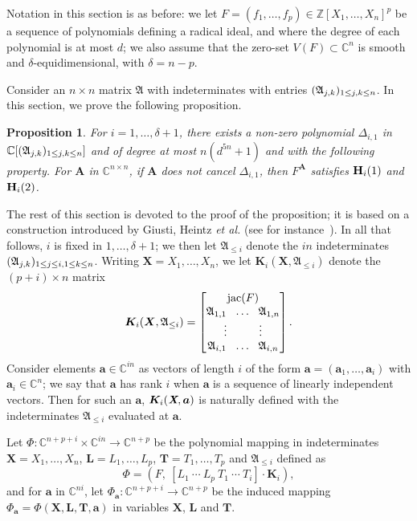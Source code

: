 \documentclass[12pt]{article}
\def\A{\mathfrak{A}}
\def\Xb{\textit{\textbf{X}}}
\def\mA{{\bm A}}
\def\D{\Delta}
\DeclareMathOperator{\jac}{jac}
\newcommand{\ZZ}{{\mathbb{Z}}}
\def\C{\mathbb{C}}
\def\bbm{\begin{bmatrix}}
\def\ebm{\end{bmatrix}}
\newtheorem{prop}[theorem]{Proposition}
\begin{document}
Notation in this section is as before: we let $F=(f_1,\hdots,f_p) \in
\ZZ[X_1,\hdots,X_n]^p$ be a sequence of polynomials defining a radical
ideal, and where the degree of each polynomial is at most $d$; we 
also assume that the zero-set $V(F) \subset \C^n$ is smooth 
and $\delta$-equidimensional, with $\delta=n-p$. 

Consider an $n \times n$ matrix $\A$ with indeterminates with entries
$(\frak A_{j,k})_{1\le j,k \le n}$. In this section, we prove the
following proposition.

\begin{prop}\label{prop:Hi12}
  For $i=1,\dots,\delta+1$, there exists a non-zero polynomial
  $\D_{i,1}$ in $\C[(\frak A_{j,k})_{1\le j,k \le n}]$ and of degree
  at most $n(d^{5n}+1)$ and with the following property. For $\mA$ in
  $\C^{n\times n}$, if $\mA$ does not cancel $\D_{i,1}$, then $F^\mA$
  satisfies ${\bf H}_i(1)$ and ${\bf H}_i(2)$.
\end{prop}
The rest of this section is devoted to the proof of the proposition;
it is based on a construction introduced by Giusti, Heintz {\it et
  al.} (see for instance~\cite{BaGiHeSaSh10}). In all that follows,
$i$ is fixed in $1,\dots,\delta+1$; we then let $\A_{\le i}$ denote
the $in$ indeterminates $(\frak A_{j,k})_{1\le j \le i, 1 \le k \le
  n}$. Writing $\bm X=X_1,\dots,X_n$, we let $\bm K_i(\bm X,\A_{\le
  i})$ denote the $(p+i)\times n$ matrix
\[
\bm
K_i(\bm X, \A_{\le i})=
\bbm 
\jac(F)\\
\A_{1,1}~~ \hdots ~~\A_{1,n}\\
\vdots\hspace{10mm}\vdots\\
\A_{i,1}~~ \hdots ~~\A_{i,n}
\ebm.
\]
Consider elements $\bm a \in \C^{in}$ as vectors of length $i$ of the
form $\bm a = (\bm a_1,\hdots,\bm a_i)$ with $\bm a_i \in \C^n$;
we say that $\bm a$ has rank $i$
when $\bm a$ is a sequence of linearly independent vectors.  Then
for such an $\bm a$, $\bm K_i(\Xb,\bm a)$ is naturally defined with the
indeterminates $\A_{\le i}$ evaluated at $\bm a$. 

Let $\Phi: \C^{n+p+i}\times \C^{i n} \to \C^{n+p}$ be  the polynomial mapping
in indeterminates 
$\bm X=X_1,\dots,X_n$, $\bm L=L_1,\dots,L_p$, $\bm T=T_1,\dots,T_p$ 
and $\A_{\le i}$ 
defined as
\[\Phi = ( F,\ [L_1 ~\cdots~L_p~T_1~\cdots~T_i] \cdot \bm K_i ),\]
and for $\bm a$ in $\C^{ni}$, let $\Phi_{\bm a}: \C^{n+p+i} \to
\C^{n+p}$ be the induced mapping $\Phi_{\bm a} = \Phi(\bm X, \bm L, \bm
T, \bm a)$ in variables $\bm X$, $\bm L$ and $\bm T$.
\end{document}
